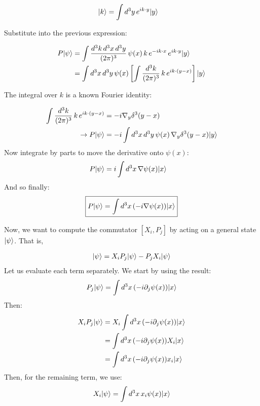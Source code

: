 \documentclass[12pt]{article}
\DeclarePairedDelimiter\ket{\lvert}{\rangle}
\begin{document}
\begin{align*}
\ket{k} &= \int d^3y \, e^{i k \cdot y} \ket{y}
\end{align*}

Substitute into the previous expression:

\begin{align*}
P\ket{\psi} &= \int \frac{d^3k \, d^3x \, d^3y}{(2\pi)^3} \, \psi(x) \, k \, e^{-i k \cdot x} \, e^{i k \cdot y} \ket{y} \\
&= \int d^3x \, d^3y \, \psi(x) \left[ \int \frac{d^3k}{(2\pi)^3} \, k \, e^{i k \cdot (y - x)} \right] \ket{y}
\end{align*}

The integral over \( k \) is a known Fourier identity:

\begin{align*}
\int \frac{d^3k}{(2\pi)^3} \, k \, e^{i k \cdot (y - x)} &= -i \nabla_y \delta^3(y - x)\\
\rightarrow P\ket{\psi} &= -i \int d^3x \, d^3y \, \psi(x) \, \nabla_y \delta^3(y - x) \ket{y}
\end{align*}
Now integrate by parts to move the derivative onto \( \psi(x) \):
\begin{align*}
P\ket{\psi} &= i \int d^3x \, \nabla \psi(x) \ket{x}
\end{align*}
And so finally:
\begin{align}
\boxed{P\ket{\psi} = \int d^3x \, (-i \nabla \psi(x)) \ket{x}}
\end{align}

Now, we want to compute the commutator \( [X_i, P_j] \) by acting on a general state \( \ket{\psi} \). That is,

\begin{align*}
[X_i, P_j] \ket{\psi} = X_i P_j \ket{\psi} - P_j X_i \ket{\psi}
\label{eq:commutator_definition}
\end{align*}
Let us evaluate each term separately. We start by using the result:
\[
P_j \ket{\psi} = \int d^3x \, (-i \partial_j \psi(x)) \ket{x}
\]
Then:
\begin{align*}
X_i P_j \ket{\psi} &= X_i \int d^3x \, (-i \partial_j \psi(x)) \ket{x} \nonumber \\
&= \int d^3x \, (-i \partial_j \psi(x)) X_i \ket{x} \nonumber \\
&= \int d^3x \, (-i \partial_j \psi(x)) x_i \ket{x}
\label{eq:first_term}
\end{align*}
Then, for the remaining term, we use:
\[
X_i \ket{\psi} = \int d^3x \, x_i \psi(x) \ket{x}
\]
\end{document}
